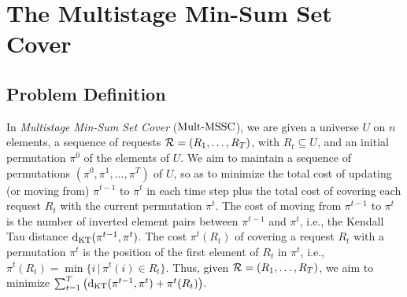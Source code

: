 \section{The Multistage Min-Sum Set Cover}

\subsection{Problem Definition}
\label{s:intro}

In \emph{Multistage Min-Sum Set Cover} ($\mathrm{Mult}\text{-}\mathrm{MSSC}$), we are given a universe $U$ on $n$ elements, a sequence of requests $\mathcal{R} = (R_1, \ldots, R_T)$, with $R_t \subseteq U$, and an initial permutation $\pi^0$ of the elements of $U$. We aim to maintain a sequence of permutations $(\pi^0, \pi^1, \ldots, \pi^T)$ of $U$, so as to minimize the total cost of updating (or moving from) $\pi^{t-1}$ to $\pi^{t}$ in each time step plus the total cost of covering each request $R_t$ with the current permutation $\pi^t$. The cost of moving from $\pi^{t-1}$ to $\pi^{t}$ is the number of inverted element pairs between $\pi^{t-1}$ and $\pi^t$, i.e., the Kendall Tau distance $\mathrm{d}_{\mathrm{KT}}(\pi^{t-1}, \pi^t)$. The cost $\pi^t(R_t)$ of covering a request $R_t$ with a permutation $\pi^t$ is the position of the first element of $R_t$ in $\pi^t$, i.e., $\pi^t(R_t) = \min\{ i \,|\, \pi^t(i) \in R_t \}$. Thus, given $\mathcal{R} = (R_1, \ldots, R_T)$, we aim to minimize $\sum_{t=1}^T \big( \mathrm{d}_{\mathrm{KT}}(\pi^{t-1}, \pi^t) + \pi^t(R_t) \big)$. 
%

